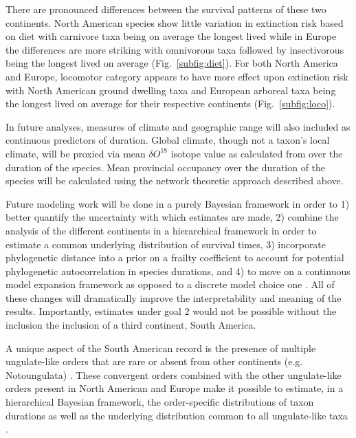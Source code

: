 \documentclass[11pt,letterpaper]{article}
\begin{document}
There are pronounced differences between the survival patterns of these two continents. North American species show little variation in extinction risk based on diet with carnivore taxa being on average the longest lived while in Europe the differences are more striking with omnivorous taxa followed by insectivorous being the longest lived on average (Fig.~\ref{subfig:diet}). For both North America and Europe, locomotor category appears to have more effect upon extinction risk with North American ground dwelling taxa and European arboreal taxa being the longest lived on average for their respective continents (Fig.~\ref{subfig:loco}).

In future analyses, measures of climate and geographic range will also included as continuous predictors of duration. Global climate, though not a taxon's local climate, will be proxied via mean \(\delta O^{18}\) isotope value as calculated from \citet{Zachos2008} over the duration of the species. Mean provincial occupancy over the duration of the species will be calculated using the network theoretic approach described above.

Future modeling work will be done in a purely Bayesian framework in order to 1) better quantify the uncertainty with which estimates are made, 2) combine the analysis of the different continents in a hierarchical framework in order to estimate a common underlying distribution of survival times, 3) incorporate phylogenetic distance into a prior on a frailty coefficient \citep{Banerjee2003a,Ibrahim2001} to account for potential phylogenetic autocorrelation in species durations, and 4) to move on a continuous model expansion framework as opposed to a discrete model choice one \citep{Gelman2013d}. All of these changes will dramatically improve the interpretability and meaning of the results. Importantly, estimates under goal 2 would not be possible without the inclusion the inclusion of a third continent, South America. 

A unique aspect of the South American record is the presence of multiple ungulate-like orders that are rare or absent from other continents (e.g. Notoungulata) \citep{Marshall1982,Macfadden1997,Macfadden2006,Flynn1998a}. These convergent orders combined with the other ungulate-like orders present in North American and Europe make it possible to estimate, in a hierarchical Bayesian framework, the order-specific distributions of taxon durations as well as the underlying distribution common to all ungulate-like taxa \citep{Gelman2013d}.
\end{document}
